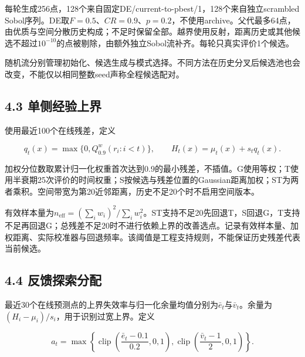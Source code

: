 \documentclass[11pt,a4paper]{article}
\begin{document}
每轮生成256点，128个来自固定DE/current-to-pbest/1，128个来自独立scrambled
Sobol序列。DE取\(F=0.5\)、\(CR=0.9\)、\(p=0.2\)，不使用archive。父代最多64点，由优质与空间分散历史构成；不足时保留全部。越界使用反射，距离历史或其他候选不超过\(10^{-10}\)的点被剔除，由额外独立Sobol流补齐。每轮只真实评价1个候选。

随机流分别管理初始化、候选生成与模式选择。不同方法在历史分叉后候选池也会改变，不能仅以相同整数seed声称全程候选配对。

\par{}\noindent\begin{minipage}{\linewidth}

\hypertarget{ux5355ux4fa7ux7ecfux9a8cux4e0aux754c}{%
\subsection{4.3
单侧经验上界}\label{ux5355ux4fa7ux7ecfux9a8cux4e0aux754c}}

使用最近100个在线残差，定义

\[
q_t(x)=\max\{0,Q^w_{0.9}(r_i:i<t)\},\qquad H_t(x)=\mu_t(x)+s_tq_t(x).
\]

\end{minipage}\par

加权分位数取累计归一化权重首次达到0.9的最小残差，不插值。G使用等权；T使用半衰期25次评价的时间权重；S按候选与残差位置的Gaussian距离加权；ST为两者乘积。空间带宽为第20近邻距离，历史不足20个时不启用空间版本。

有效样本量为\(n_{\mathrm{eff}}=(\sum_i w_i)^2/\sum_i w_i^2\)。ST支持不足20先回退T，S回退G，T支持不足再回退G；总残差不足20时不进行依赖上界的改善选点。记录有效样本量、加权距离、实际校准器与回退频率。该阈值是工程支持规则，不能保证历史残差代表当前候选。

\par{}\noindent\begin{minipage}{\linewidth}

\hypertarget{ux53cdux9988ux63a2ux7d22ux5206ux914d}{%
\subsection{4.4
反馈探索分配}\label{ux53cdux9988ux63a2ux7d22ux5206ux914d}}

最近30个在线预测点的上界失效率与归一化余量均值分别为\(\bar e_t\)与\(\bar v_t\)。余量为\((H_i-\mu_i)/s_i\)，用于识别过宽上界。定义

\[
a_t=\max\left\{\operatorname{clip}\left(\frac{\bar e_t-0.1}{0.2},0,1\right),\operatorname{clip}\left(\frac{\bar v_t-1}{2},0,1\right)\right\}.
\]

\end{minipage}\par
\end{document}
